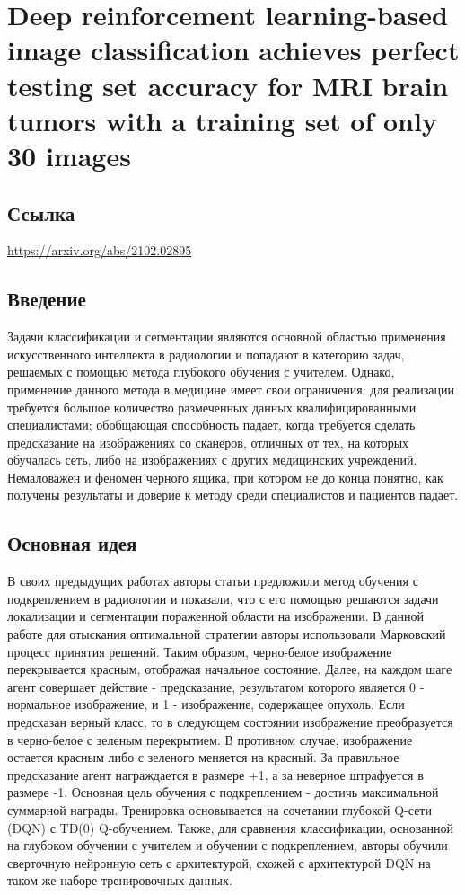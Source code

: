 \section{Deep reinforcement learning-based image classification achieves perfect testing set accuracy for MRI brain tumors with a training set of only 30 images}

\subsection*{Ссылка}\url{https://arxiv.org/abs/2102.02895}

\subsection*{Введение}
Задачи классификации и сегментации являются основной областью применения искусственного 
интеллекта в радиологии и попадают в категорию задач, решаемых с помощью метода глубокого обучения с учителем. 
Однако, применение данного метода в медицине имеет свои ограничения: для реализации требуется большое количество размеченных данных 
квалифицированными специалистами; обобщающая способность падает, когда требуется сделать предсказание на изображениях со сканеров, отличных от тех, 
на которых обучалась сеть, либо на изображениях с других медицинских учреждений. Немаловажен и феномен \glqq черного ящика\grqq, при котором 
не до конца понятно, как получены результаты и доверие к методу среди специалистов и пациентов падает. 
\subsection*{Основная идея}
В своих предыдущих работах авторы статьи предложили метод обучения с подкреплением в радиологии и показали, 
что с его помощью решаются задачи локализации и сегментации пораженной области на изображении. В данной работе для отыскания 
оптимальной стратегии авторы использовали Марковский процесс принятия решений. Таким образом, черно-белое изображение 
перекрывается красным, отображая начальное состояние. Далее, на каждом шаге агент совершает действие - предсказание, 
результатом которого является 0 - нормальное изображение, и 1 - изображение, содержащее опухоль. Если предсказан верный класс, 
то в следующем состоянии изображение преобразуется в черно-белое с зеленым перекрытием. В противном случае, изображение остается 
красным либо с зеленого меняется на красный. За правильное предсказание агент награждается в размере +1, а за неверное штрафуется 
в размере -1. Основная цель обучения с подкреплением - достичь максимальной суммарной награды. Тренировка основывается 
на сочетании глубокой Q-сети (DQN) с TD(0) Q-обучением. Также, для сравнения классификации, основанной на глубоком обучении 
с учителем и обучении с подкреплением, авторы обучили сверточную нейронную сеть с архитектурой, схожей с архитектурой DQN на таком же наборе 
тренировочных данных.
